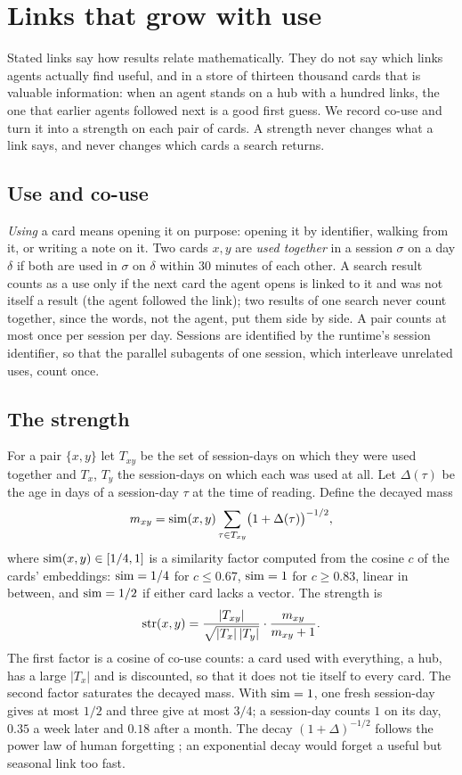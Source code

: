 \section{Links that grow with use}\label{sec:strength}

Stated links say how results relate mathematically. They do not say which links agents actually find useful, and in a store of thirteen thousand cards that is valuable information: when an agent stands on a hub with a hundred links, the one that earlier agents followed next is a good first guess. We record co-use and turn it into a strength on each pair of cards. A strength never changes what a link says, and never changes which cards a search returns.

\subsection{Use and co-use}
\emph{Using} a card means opening it on purpose: opening it by identifier, walking from it, or writing a note on it. Two cards $x,y$ are \emph{used together} in a session $\sigma$ on a day $\delta$ if both are used in $\sigma$ on $\delta$ within $30$ minutes of each other. A search result counts as a use only if the next card the agent opens is linked to it and was not itself a result (the agent followed the link); two results of one search never count together, since the words, not the agent, put them side by side. A pair counts at most once per session per day. Sessions are identified by the runtime's session identifier, so that the parallel subagents of one session, which interleave unrelated uses, count once.

\subsection{The strength}
For a pair $\{x,y\}$ let $T_{xy}$ be the set of session-days on which they were used together and $T_x$, $T_y$ the session-days on which each was used at all. Let $\Delta(\tau)$ be the age in days of a session-day $\tau$ at the time of reading. Define the decayed mass
\[
m_{xy}=\operatorname{sim}(x,y)\sum_{\tau\in T_{xy}}\bigl(1+\Delta(\tau)\bigr)^{-1/2},
\]
where $\operatorname{sim}(x,y)\in[1/4,1]$ is a similarity factor computed from the cosine $c$ of the cards' embeddings: $\operatorname{sim}=1/4$ for $c\le 0.67$, $\operatorname{sim}=1$ for $c\ge0.83$, linear in between, and $\operatorname{sim}=1/2$ if either card lacks a vector. The strength is
\begin{equation}\label{eq:strength}
\operatorname{str}(x,y)=\frac{|T_{xy}|}{\sqrt{|T_x|\,|T_y|}}\cdot\frac{m_{xy}}{m_{xy}+1}.
\end{equation}
The first factor is a cosine of co-use counts: a card used with everything, a hub, has a large $|T_x|$ and is discounted, so that it does not tie itself to every card. The second factor saturates the decayed mass. With $\operatorname{sim}=1$, one fresh session-day gives at most $1/2$ and three give at most $3/4$; a session-day counts $1$ on its day, $0.35$ a week later and $0.18$ after a month. The decay $(1+\Delta)^{-1/2}$ follows the power law of human forgetting \cite{WixtedEbbesen1991,AndersonSchooler1991}; an exponential decay would forget a useful but seasonal link too fast.

